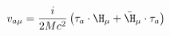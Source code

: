 \begin{equation}
  \label{eq:vtauH}
  v_{a\mu}=\frac{i}{2Mc^2}\left(\tau_a\cdot\H_\mu+\bar{\H}_\mu\cdot\tau_a \right)
\end{equation}

